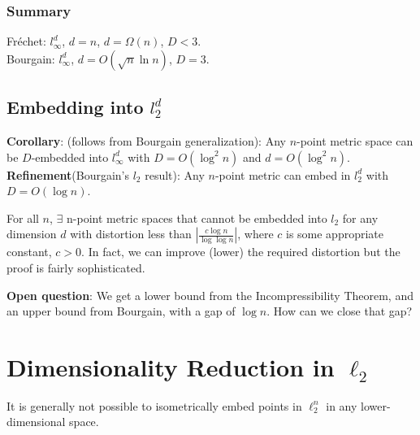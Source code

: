 \subsubsection{Summary}
Fr\'echet: $l_\infty^d$, $d=n$, $d=\Omega (n)$, $D<3$. \\
Bourgain: $l_\infty^d$, $d=O(\sqrt{n}\ln n)$, $D=3$. \\

\subsection{Embedding into $l_2^d$}
\textbf{Corollary}: (follows from Bourgain generalization): Any
$n$-point metric space can be $D$-embedded into $l_\infty^d$ with
$D=O(\log^2 n)$ and $d=O(\log^2 n)$. \\  
\textbf{Refinement}(Bourgain's $l_2$ result): Any $n$-point metric can
embed in $l_2^d$ with $D=O(\log n)$.\\ 

\begin{theorem}
For all $n$, $\exists$ n-point metric spaces that cannot 
be embedded into $l_2$ for any dimension $d$ with distortion
less than 
$|\frac{c \log n}{\log \log n}|$,
where $c$ is some appropriate constant, $c>0$. In fact, we can
improve (lower) the required distortion but the proof is fairly
sophisticated. \\
\end{theorem}

\textbf{Open question}: We get a lower bound from the
Incompressibility Theorem, and an upper bound from Bourgain,
with a gap of $\log n$. How can we close that gap? \\
  
  
  
  
  
\section{Dimensionality Reduction in $\ell_2$}
It is generally not possible to isometrically embed points in 
$\ell_2^n$ in any lower-dimensional space.

